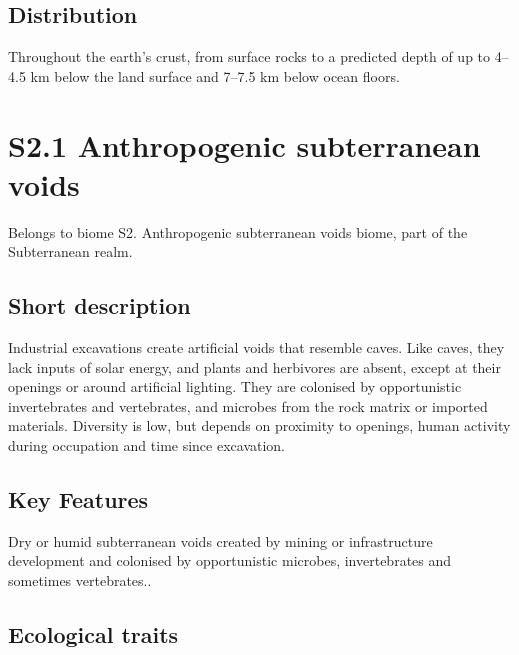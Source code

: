 \documentclass[
  letterpaper,
  DIV=11,
  numbers=noendperiod]{scrartcl}
\begin{document}
\subsection{Distribution}\label{distribution-60}

Throughout the earth's crust, from surface rocks to a predicted depth of
up to 4--4.5 km below the land surface and 7--7.5 km below ocean floors.

\section{S2.1 Anthropogenic subterranean
voids}\label{s2.1-anthropogenic-subterranean-voids}

Belongs to biome S2. Anthropogenic subterranean voids biome, part of the
Subterranean realm.

\subsection{Short description}\label{short-description-61}

Industrial excavations create artificial voids that resemble caves. Like
caves, they lack inputs of solar energy, and plants and herbivores are
absent, except at their openings or around artificial lighting. They are
colonised by opportunistic invertebrates and vertebrates, and microbes
from the rock matrix or imported materials. Diversity is low, but
depends on proximity to openings, human activity during occupation and
time since excavation.

\subsection{Key Features}\label{key-features-61}

Dry or humid subterranean voids created by mining or infrastructure
development and colonised by opportunistic microbes, invertebrates and
sometimes vertebrates..

\subsection{Ecological traits}\label{ecological-traits-61}
\end{document}
